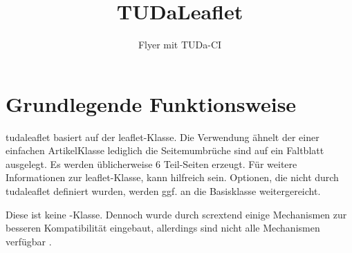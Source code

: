 \documentclass[
	color=3c,
	]{tudaleaflet}
\let\pck\textsf
\let\cls\textsf
\begin{document}
\title{TUDaLeaflet}
\subtitle{Flyer mit TUDa-CI}


\maketitle

\section{Grundlegende Funktionsweise}
\cls{tudaleaflet} basiert auf der \cls{leaflet}-Klasse. Die Verwendung ähnelt der einer einfachen ArtikelKlasse lediglich die Seitemumbrüche sind auf ein Faltblatt ausgelegt. Es werden üblicherweise 6 Teil-Seiten erzeugt. Für weitere Informationen zur \cls{leaflet}-Klasse, kann \cite{leaflet} hilfreich sein. Optionen, die nicht durch \cls{tudaleaflet} definiert wurden, werden ggf. an die Basisklasse weitergereicht.

Diese ist keine \KOMAScript-Klasse. Dennoch wurde durch \pck{scrextend} einige Mechanismen zur besseren Kompatibilität eingebaut, allerdings sind nicht alle Mechanismen verfügbar \cite[vgl.][]{scrguide}.
\end{document}
